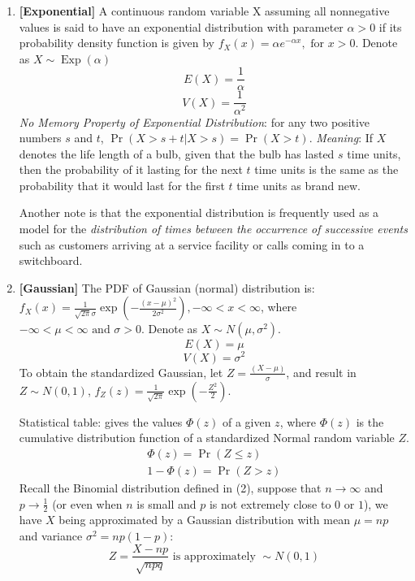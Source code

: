 \documentclass[a4paper]{article}
\begin{document}
\begin{enumerate}
\item
\textbf{[Exponential]}
A continuous random variable X assuming all nonnegative values is said to have an exponential distribution with parameter $\alpha > 0$ if its probability density function is given by $f_{X}(x)=\alpha e^{-\alpha x}, \text { for } x>0$. Denote as $X \sim \operatorname{Exp}(\alpha)$
\begin{equation}
E(X)=\frac{1}{\alpha}
\end{equation}
\begin{equation}
V(X)=\frac{1}{\alpha^{2}}
\end{equation}
\textit{No Memory Property of Exponential Distribution}: for any two positive numbers $s$ and $t$, $\operatorname{Pr}(X>s+t | X>s)=\operatorname{Pr}(X>t)$. 
\textit{Meaning}: If $X$ denotes the life length of a bulb, given that the bulb has lasted $s$ time units, then the probability of it lasting for the next $t$ time units is the same as the probability that it would last for the first $t$ time units as brand new. 

Another note is that the exponential distribution is frequently used as a model for the \textit{distribution of times between the occurrence of successive events} such as customers arriving at a service facility or calls coming in to a switchboard.

\item
\textbf{[Gaussian]}
The PDF of Gaussian (normal) distribution is: $f_{X}(x)=\frac{1}{\sqrt{2 \pi} \sigma} \exp \left(-\frac{(x-\mu)^{2}}{2 \sigma^{2}}\right), -\infty<x<\infty$, where $-\infty<\mu<\infty \text { and } \sigma>0$. Denote as $X \sim N\left(\mu, \sigma^{2}\right)$.
\begin{equation}
E(X)=\mu
\end{equation}
\begin{equation}
V(X)=\sigma^{2}
\end{equation}
To obtain the standardized Gaussian, let $Z=\frac{(X-\mu)}{\sigma}$, and result in $Z \sim N(0,1)$,  $f_{Z}(z)=\frac{1}{\sqrt{2 \pi}} \exp \left(-\frac{Z^{2}}{2}\right)$.

Statistical table: gives the values $\Phi(z)$ of a given $z$, where $\Phi(z)$ is the cumulative distribution function of a standardized Normal random variable $Z$. 
\begin{equation}
\begin{array}{c}{\Phi(z)=\operatorname{Pr}(Z \leq z)} \\ {1-\Phi(z)=\operatorname{Pr}(Z>z)}\end{array}
\end{equation}
Recall the Binomial distribution defined in (2), suppose that $n \rightarrow \infty$ and $p \rightarrow \frac{1}{2}$ (or even when $n$ is small and $p$ is not extremely close to $0$ or $1$), we have $X$ being approximated by a Gaussian distribution with mean $\mu=n p$ and variance $\sigma^{2}=n p(1-p)$:
\[Z=\frac{X-n p}{\sqrt{n p q}} \text { is approximately } \sim N(0,1)
\]


\end{enumerate}
\end{document}
